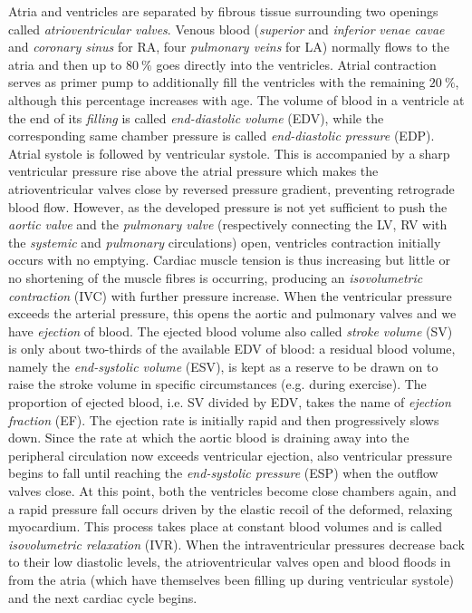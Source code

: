 \vspace{0.2cm}
Atria and ventricles are separated by fibrous tissue surrounding two openings called \textit{atrioventricular valves}. Venous blood (\textit{superior} and \textit{inferior} \textit{venae cavae} and \textit{coronary sinus} for RA, four \textit{pulmonary veins} for LA) normally flows to the atria and then up to $\SI{80}{\percent}$ goes directly into the ventricles. Atrial contraction serves as primer pump to additionally fill the ventricles with the remaining $\SI{20}{\percent}$, although this percentage increases with age. The volume of blood in a ventricle at the end of its \textit{filling} is called \textit{end-diastolic volume} (\acs{EDV}), while the corresponding same chamber pressure is called \textit{end-diastolic pressure} (\acs{EDP}). Atrial systole is followed by ventricular systole. This is accompanied by a sharp ventricular pressure rise above the atrial pressure which makes the atrioventricular valves close by reversed pressure gradient, preventing retrograde blood flow. However, as the developed pressure is not yet sufficient to push the \textit{aortic valve} and the \textit{pulmonary valve} (respectively connecting the LV, RV with the \textit{systemic} and \textit{pulmonary} circulations) open, ventricles contraction initially occurs with no emptying. Cardiac muscle tension is thus increasing but little or no shortening of the muscle fibres is occurring, producing an \textit{isovolumetric contraction} (\acs{IVC}) with further pressure increase. When the ventricular pressure exceeds the arterial pressure, this opens the aortic and pulmonary valves and we have \textit{ejection} of blood. The ejected blood volume also called \textit{stroke volume} (\acs{SV}) is only about two-thirds of the available EDV of blood: a residual blood volume, namely the \textit{end-systolic volume} (\acs{ESV}), is kept as a reserve to be drawn on to raise the stroke volume in specific circumstances (e.g. during exercise). The proportion of ejected blood, i.e. SV divided by EDV, takes the name of \textit{ejection fraction} (\acs{EF}). The ejection rate is initially rapid and then progressively slows down. Since the rate at which the aortic blood is draining away into the peripheral circulation now exceeds ventricular ejection, also ventricular pressure begins to fall until reaching the \textit{end-systolic pressure} (\acs{ESP}) when the outflow valves close. At this point, both the ventricles become close chambers again, and a rapid pressure fall occurs driven by the elastic recoil of the deformed, relaxing myocardium. This process takes place at constant blood volumes and is called \textit{isovolumetric relaxation} (\acs{IVR}). When the intraventricular pressures decrease back to their low diastolic levels, the atrioventricular valves open and blood floods in from the atria (which have themselves been filling up during ventricular systole) and the next cardiac cycle begins.


